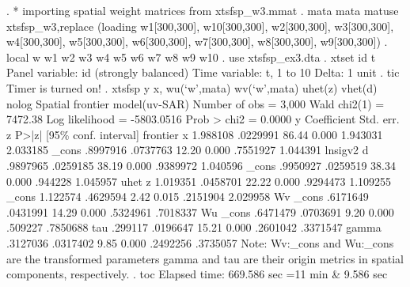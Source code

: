 . * importing spatial weight matrices from xtsfsp_w3.mmat
. mata mata matuse xtsfsp_w3,replace
(loading w1[300,300], w10[300,300], w2[300,300], w3[300,300], w4[300,300],
 w5[300,300], w6[300,300], w7[300,300], w8[300,300], w9[300,300])
{\smallskip}
. local w w1 w2 w3 w4 w5 w6 w7 w8 w9 w10
{\smallskip}
. use xtsfsp_ex3.dta
{\smallskip}
. xtset id t
{\smallskip}
Panel variable: id (strongly balanced)
 Time variable: t, 1 to 10
         Delta: 1 unit
{\smallskip}
. tic
Timer is turned on!
{\smallskip}
. xtsfsp y x, wu(`w',mata) wv(`w',mata) uhet(z) vhet(d) nolog
{\smallskip}
Spatial frontier model(uv-SAR)                         Number of obs =   3,000
                                                       Wald chi2(1)  = 7472.38
Log likelihood = -5803.0516                            Prob > chi2   =  0.0000
{\smallskip}
           y {\VBAR} Coefficient  Std. err.      z    P>|z|     [95\% conf. interval]
frontier     {\VBAR}
           x {\VBAR}   1.988108   .0229991    86.44   0.000     1.943031    2.033185
       _cons {\VBAR}   .8997916   .0737763    12.20   0.000     .7551927    1.044391
lnsigv2      {\VBAR}
           d {\VBAR}   .9897965   .0259185    38.19   0.000     .9389972    1.040596
       _cons {\VBAR}   .9950927   .0259519    38.34   0.000      .944228    1.045957
uhet         {\VBAR}
           z {\VBAR}   1.019351   .0458701    22.22   0.000     .9294473    1.109255
       _cons {\VBAR}   1.122574   .4629594     2.42   0.015     .2151904    2.029958
Wv           {\VBAR}
       _cons {\VBAR}   .6171649   .0431991    14.29   0.000     .5324961    .7018337
Wu           {\VBAR}
       _cons {\VBAR}   .6471479   .0703691     9.20   0.000      .509227    .7850688
         tau {\VBAR}    .299117   .0196647    15.21   0.000     .2601042    .3371547
       gamma {\VBAR}   .3127036   .0317402     9.85   0.000     .2492256    .3735057
Note: Wv:_cons and Wu:_cons are the transformed parameters
      gamma and tau are their origin metrics in spatial components, respectively.
{\smallskip}
. toc
Elapsed time: 669.586 sec
             =11 min \& 9.586 sec
{\smallskip}
